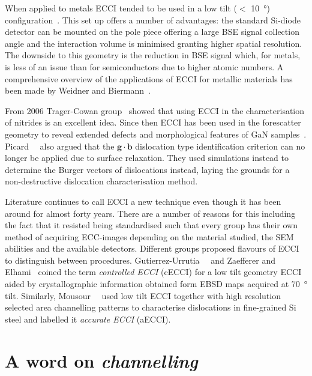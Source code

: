When applied to metals ECCI tended to be used in a low tilt ($<$ \SI{10}{\degree}) configuration~\cite{Simkin99}. This set up offers a number of advantages: the standard Si-diode detector can be mounted on the pole piece offering a large BSE signal collection angle and the interaction volume is minimised granting higher spatial resolution. The downside to this geometry is the reduction in BSE signal which, for metals, is less of an issue than for semiconductors due to higher atomic numbers. A comprehensive overview of the applications of ECCI for metallic materials has been made by Weidner and Biermann~\cite{Weidner15}.

From 2006 Trager-Cowan group~\cite{Trager06} showed that using ECCI in the characterisation of nitrides is an excellent idea. Since then ECCI has been used in the forescatter geometry to reveal extended defects and
morphological features of GaN samples~\cite{Picard}. Picard~\etal~\cite{Picard09} also argued that the $\mathbf{g}\cdot\mathbf{b}$ dislocation type identification criterion can no longer be applied due to surface relaxation. They used simulations instead to determine the Burger vectors of dislocations instead, laying the grounds for a non-destructive dislocation characterisation method. 

Literature continues to call ECCI a new technique even though it has been around for almost forty years. There are a number of reasons for this including the fact that it resisted being standardised such that every group has their own method of acquiring ECC-images depending on the material studied, the SEM abilities and the available detectors. Different groups proposed flavours of ECCI to distinguish between procedures. Gutierrez-Urrutia~\etal~\cite{Gutierrez09} and Zaefferer and Elhami~\cite{Zaefferer14} coined the term \textit{controlled ECCI} (cECCI) for a low tilt geometry ECCI aided by crystallographic information obtained form EBSD maps acquired at \SI{70}{\degree} tilt. Similarly, Mousour~\etal~\cite{Mansour15} used low tilt ECCI together with high resolution selected area channelling patterns to characterise dislocations in fine-grained Si steel and labelled it \textit{accurate ECCI} (aECCI). 

\section{A word on \textit{channelling}}
\label{sec:channelling}




